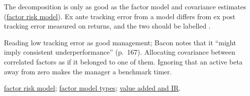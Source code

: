 \begin{qfmethod}
 The decomposition is only as good as the factor model and covariance estimates (\hyperref[mod:factor-risk-model]{factor risk model}). Ex ante tracking error from a model differs from ex post tracking error measured on returns, and the two should be labelled \citep[p.~167]{wide-bacon-attribution}.

 Reading low tracking error as good management; Bacon notes that it ``might imply consistent underperformance'' (p.~167). Allocating covariance between correlated factors as if it belonged to one of them. Ignoring that an active beta away from zero makes the manager a benchmark timer.

 \hyperref[mod:factor-risk-model]{factor risk model}; \hyperref[def:factor-model-types]{factor model types}; \hyperref[meth:active-return-information-ratio]{value added and IR}.

\end{qfmethod}
